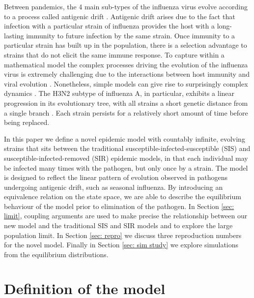 \documentclass[review]{elsarticle}
\begin{document}
Between pandemics, the 4 main sub-types of the influenza virus evolve according to a process called antigenic drift \cite{brown2009}. Antigenic drift arises due to the fact that infection with a particular strain of influenza provides the host with a long-lasting immunity to future infection by the same strain. Once immunity to a particular strain has built up in the population, there is a selection advantage to strains that do not elicit the same immune response. To capture within a mathematical model the complex processes driving the evolution of the influenza virus is extremely challenging due to the interactions between host immunity and viral evolution \cite{bedford2014}. Nonetheless, simple models can give rise to surprisingly complex dynamics \cite{roberts2019,bedford2012}. The H3N2 subtype of influenza A, in particular, exhibits a linear progression in its evolutionary tree, with all strains a short genetic distance from a single branch \cite{fitch1997,bedford2015}. Each strain persists for a relatively short amount of time before being replaced.   

In this paper we define a novel epidemic model with countably infinite, evolving strains that sits between the traditional susceptible-infected-susceptible (SIS) and susceptible-infected-removed (SIR) epidemic models, in that each individual may be infected many times with the pathogen, but only once by a strain. The model is designed to reflect the linear pattern of evolution observed in pathogens undergoing antigenic drift, such as seasonal influenza. By introducing an equivalence relation on the state space, we are able to describe the equilibrium behaviour of the model prior to elimination of the pathogen. In Section \ref{sec: limit}, coupling arguments are used to make precise the relationship between our new model and the traditional SIS and SIR models and to explore the large population limit. In Section \ref{sec: repro} we discuss three reproduction numbers for the novel model. Finally in Section \ref{sec: sim study} we explore simulations from the equilibrium distributions.

\section{Definition of the model}\label{sec: models}
\end{document}
